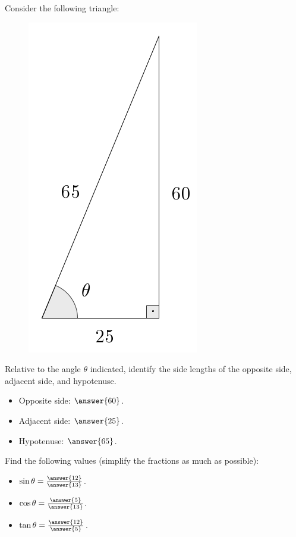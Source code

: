 \documentclass{ximera}
\author{Ivo Terek}
\begin{document}
\begin{exercise}

  Consider the following triangle:

  \begin{figure}[h]
    \centering
    \includegraphics[scale=.3]{RTT1-fig.png}
  \end{figure}

  Relative to the angle $\theta$ indicated, identify the side lengths of the opposite side, adjacent side, and hypotenuse.

  \begin{itemize}
  \item Opposite side: $\answer{60}$.
  \item Adjacent side: $\answer{25}$.
  \item Hypotenuse: $\answer{65}$.
  \end{itemize}

  \begin{exercise}
    Find the following values (simplify the fractions as much as possible):
    \begin{itemize}
    \item $\sin\theta = \frac{\answer{12}}{\answer{13}}$.
    \item $\cos\theta = \frac{\answer{5}}{\answer{13}}$.
    \item $\tan\theta = \frac{\answer{12}}{\answer{5}}$.
    \end{itemize}
  \end{exercise}
 
\end{exercise}
\end{document}
